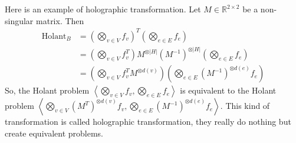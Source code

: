 \documentclass{article}
\def\<{\left\langle}
\def\>{\right\rangle}
\begin{document}
Here is an example of holographic transformation.
Let $M \in \mathbb{R}^{2\times 2}$ be a non-singular matrix.
Then 
\begin{align*}
  \mathrm{Holant}_B
  &= \left(\bigotimes_{v\in V} f_v\right)^T\left(\bigotimes_{e\in E} f_e\right) \\
  &= \left(\bigotimes_{v\in V} f_v^T\right) M^{\otimes |H|} (M^{-1})^{\otimes |H|}\left(\bigotimes_{e\in E} f_e\right) \\
  &= \left(\bigotimes_{v \in V} f_v^T M^{\otimes d(v)}\right) \left(\bigotimes_{e\in E} (M^{-1})^{\otimes d(e)}f_e\right)
\end{align*}
So, the Holant problem $\<\bigotimes_{v\in V}f_v, \bigotimes_{e\in E} f_e\>$ is equivalent to the Holant problem $\<\bigotimes_{v\in V} (M^T)^{\otimes d(v)}f_v, \bigotimes_{e\in E} (M^{-1})^{\otimes d(e)} f_e\>$.
This kind of transformation is called holographic transformation, they really do nothing but create equivalent problems.
\end{document}
